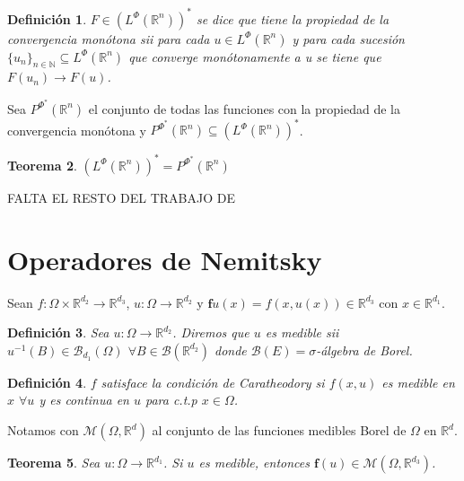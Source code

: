 \documentclass[a4paper,11pt]{amsart}
\theoremstyle{plain}
\newtheorem{thm}{Teorema}[section]
\newtheorem{defi}[thm]{Definici\'on}
\theoremstyle{remark}
\theoremstyle{remark}
\newcommand{\rr}{\mathbb{R}}
\newcommand{\nn}{\mathbb{N}}
\newcommand{\bb}{\mathcal{B}}
\newcommand{\fnet}{\boldsymbol{f}}
\numberwithin{equation}{section}
\begin{document}
\begin{defi}
$F \in (L^{\Phi}(\rr^n))^*$ se dice que tiene la propiedad de la convergencia mon\'otona  sii
para cada $u \in L^{\Phi}(\rr^n)$ y para cada sucesi\'on $\{u_n\}_{n \in \nn}\subseteq L^{\Phi}(\rr^n)$
que converge mon\'otonamente a u se tiene que $F(u_n) \to F(u)$.
\end{defi}

Sea $P^{\Phi^*}(\rr^n)$ el conjunto de todas las funciones con la propiedad de la convergencia mon\'otona
y $P^{\Phi^*}(\rr^n)\subseteq (L^{\Phi}(\rr^n))^* $. 

\begin{thm}
$(L^{\Phi}(\rr^n))^*=P^{\Phi^*}(\rr^n)$
\end{thm}


FALTA EL RESTO DEL TRABAJO DE \cite{Schap2005}

\section{Operadores de Nemitsky}


Sean $f:\Omega\times\rr^{d_2}\to \rr^{d_3}$, $u:\Omega\to \rr^{d_2}$ y
$\fnet u(x)=f(x,u(x))\in \rr^{d_3}$ con $x\in \rr^{d_1}$.

\begin{defi}
Sea $u:\Omega \to \rr^{d_2}$. Diremos que $u$ es medible sii $u^{-1}(B)\in \bb_{d_1}(\Omega)$
$\forall B \in \bb(\rr^{d_2})$ donde $\bb(E)=\sigma$-\'algebra de Borel. 
\end{defi}

\begin{defi}
$f$ satisface la condici\'on de Caratheodory si $f(x,u)$ es medible en $x$ $\forall u$ y es continua en $u$
para c.t.p $x \in \Omega$.
\end{defi}

Notamos con $\mathcal {M}(\Omega,\rr^d)$ al conjunto de las funciones medibles Borel de $\Omega $ en $\rr^d$.

\begin{thm} 
Sea $u: \Omega \to \rr^{d_1}$.
Si $u$ es medible, entonces $\fnet (u) \in \mathcal{M}(\Omega, \rr^{d_3})$.
\end{thm}
\end{document}
